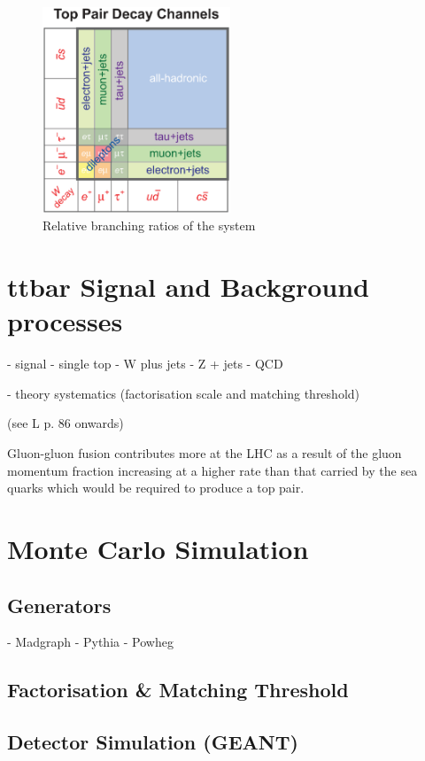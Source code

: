 \begin{figure}[hbtp]
   \centering
     \includegraphics[width=0.5\textwidth]{Chapters/02_Theory/Images/top_pair_decay_channels.eps}\hfill
     \caption{Relative branching ratios of the \ttbar system}
     \label{fig:ttbar_branching_ratios}
\end{figure}


\section{ttbar Signal and Background processes}
- signal
- single top
- W plus jets
- Z + jets
- QCD

- theory systematics (factorisation scale and matching threshold)

(see L p. 86 onwards)

Gluon-gluon fusion contributes more at the LHC as a result of the gluon momentum fraction increasing at a
higher rate than that carried by the sea quarks which would be required to produce a top pair.

\section{Monte Carlo Simulation}
\label{s:monte_carlo_simulation}
\subsection{Generators}
\label{ss:generators}
- Madgraph
- Pythia
- Powheg

\subsection{Factorisation \& Matching Threshold}
\label{ss:factorisation_and_matching_threshold}

\subsection{Detector Simulation (GEANT)}
\label{ss:detector_simulation}
